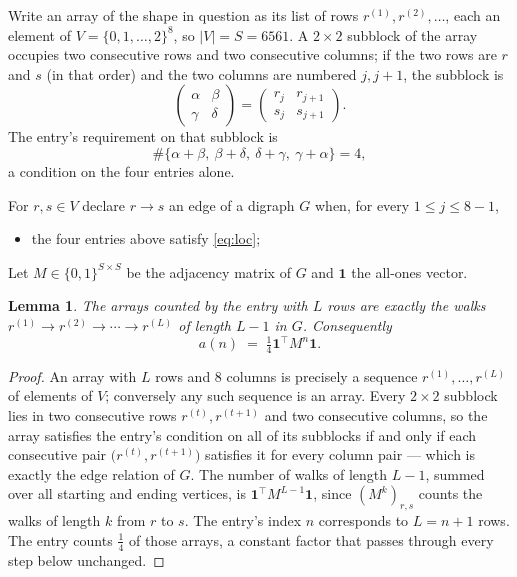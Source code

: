 \documentclass[11pt,a4paper]{article}
\theoremstyle{plain}
\newtheorem{lemma}[theorem]{Lemma}
\theoremstyle{definition}
\begin{document}
Write an array of the shape in question as its list of rows
$r^{(1)},r^{(2)},\dots$, each an element of
$V=\{0,1,\dots,2\}^{8}$, so $|V|=S=6561$. A $2\times2$ subblock of the array
occupies two consecutive rows and two consecutive columns; if the two rows are $r$
and $s$ (in that order) and the two columns are numbered $j,j+1$,
the subblock is
\[
\begin{pmatrix}\alpha&\beta\\\gamma&\delta\end{pmatrix}=\begin{pmatrix}r_j&r_{j+1}\\s_j&s_{j+1}\end{pmatrix}.
\]
The entry's requirement on that subblock is
\begin{equation}\label{eq:loc}
\#\{\alpha+\beta,\ \beta+\delta,\ \delta+\gamma,\ \gamma+\alpha\}=4,
\end{equation}
a condition on the four entries alone.

For $r,s\in V$ declare $r\to s$ an edge of a digraph $G$ when, for every
$1\le j\le 8-1$,
\begin{itemize}
\item the four entries above satisfy \eqref{eq:loc};

\end{itemize}
Let $M\in\{0,1\}^{S\times S}$ be the adjacency matrix of $G$ and $\mathbf{1}$ the
all-ones vector.

\begin{lemma}\label{lem:walk}
The arrays counted by the entry with $L$ rows are exactly the walks
$r^{(1)}\to r^{(2)}\to\cdots\to r^{(L)}$ of length $L-1$ in $G$. Consequently
\[
a(n)\;=\;\tfrac1{4}\mathbf{1}^{\!\top}M^{n}\mathbf{1} .
\]
\end{lemma}

\begin{proof}
An array with $L$ rows and $8$ columns is precisely a sequence
$r^{(1)},\dots,r^{(L)}$ of elements of $V$; conversely any such sequence is an array.
Every $2\times2$ subblock lies in two consecutive rows $r^{(t)},r^{(t+1)}$ and two
consecutive columns, so the array satisfies the entry's condition on all of its subblocks
if and only if each consecutive pair $\bigl(r^{(t)},r^{(t+1)}\bigr)$ satisfies it for
every column pair --- which is exactly the edge relation of $G$. The number of walks of
length $L-1$, summed over all starting and ending vertices, is
$\mathbf{1}^{\!\top}M^{L-1}\mathbf{1}$, since $(M^{k})_{r,s}$ counts the walks of
length $k$ from $r$ to $s$. The entry's index $n$ corresponds to $L=n+1$ rows. The entry counts $\tfrac1{4}$ of those arrays, a constant factor that passes through every step below unchanged.
\end{proof}
\end{document}
